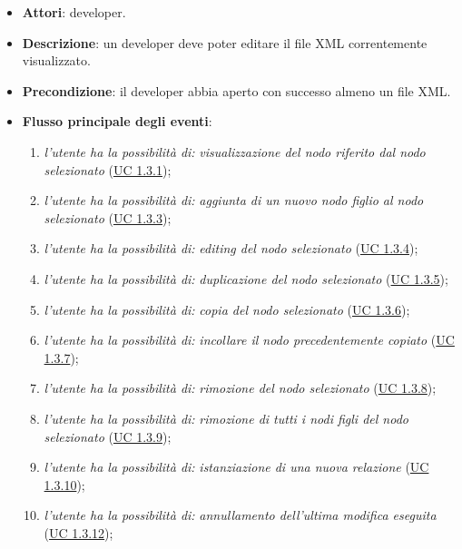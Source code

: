 		\begin{itemize}
			\item\textbf{Attori}: developer.
			\item\textbf{Descrizione}: un developer deve poter editare il file XML correntemente visualizzato.
			\item\textbf{Precondizione}: il developer abbia aperto con successo almeno un file XML.
			\item\textbf{Flusso principale degli eventi}: 
			\begin{enumerate}
				\item \textit{l'utente ha la possibilità di:} \textit{visualizzazione del nodo riferito dal nodo selezionato} (\hyperref[subsec:XEUC1.3.1]{UC 1.3.1});
				
				\item \textit{l'utente ha la possibilità di:} \textit{aggiunta di un nuovo nodo figlio al nodo selezionato} (\hyperref[subsec:XEUC1.3.3]{UC 1.3.3});
				
				\item \textit{l'utente ha la possibilità di:} \textit{editing del nodo selezionato} (\hyperref[subsec:XEUC1.3.4]{UC 1.3.4});
				
				\item \textit{l'utente ha la possibilità di:} \textit{duplicazione del nodo selezionato} (\hyperref[subsec:XEUC1.3.5]{UC 1.3.5});
				
				\item \textit{l'utente ha la possibilità di:} \textit{copia del nodo selezionato} (\hyperref[subsec:XEUC1.3.6]{UC 1.3.6});
				
				\item \textit{l'utente ha la possibilità di:} \textit{incollare il nodo precedentemente copiato} (\hyperref[subsec:XEUC1.3.7]{UC 1.3.7});
				
				\item \textit{l'utente ha la possibilità di:} \textit{rimozione del nodo selezionato} (\hyperref[subsec:XEUC1.3.8]{UC 1.3.8});
				
				\item \textit{l'utente ha la possibilità di:} \textit{rimozione di tutti i nodi figli del nodo selezionato} (\hyperref[subsec:XEUC1.3.9]{UC 1.3.9});
				
				\item \textit{l'utente ha la possibilità di:} \textit{istanziazione di una nuova relazione} (\hyperref[subsec:XEUC1.3.10]{UC 1.3.10});
				
				\item \textit{l'utente ha la possibilità di:} \textit{annullamento dell'ultima modifica eseguita} (\hyperref[subsec:XEUC1.3.12]{UC 1.3.12});
				

\end{enumerate}
\end{itemize}
